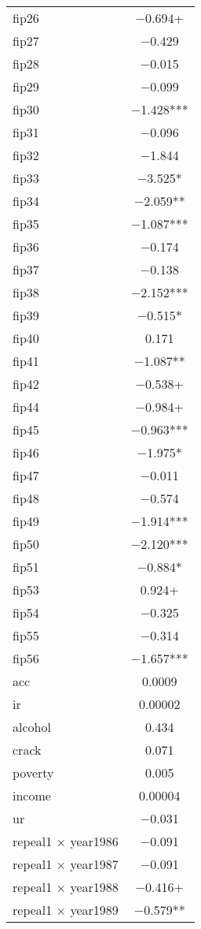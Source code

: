 \documentclass[
]{article}
\begin{document}
\begin{table}
\begin{tabular}[t]{lc}
fip26 & \num{-0.694}+\\
fip27 & \num{-0.429}\\
fip28 & \num{-0.015}\\
fip29 & \num{-0.099}\\
fip30 & \num{-1.428}***\\
fip31 & \num{-0.096}\\
fip32 & \num{-1.844}\\
fip33 & \num{-3.525}*\\
fip34 & \num{-2.059}**\\
fip35 & \num{-1.087}***\\
fip36 & \num{-0.174}\\
fip37 & \num{-0.138}\\
fip38 & \num{-2.152}***\\
fip39 & \num{-0.515}*\\
fip40 & \num{0.171}\\
fip41 & \num{-1.087}**\\
fip42 & \num{-0.538}+\\
fip44 & \num{-0.984}+\\
fip45 & \num{-0.963}***\\
fip46 & \num{-1.975}*\\
fip47 & \num{-0.011}\\
fip48 & \num{-0.574}\\
fip49 & \num{-1.914}***\\
fip50 & \num{-2.120}***\\
fip51 & \num{-0.884}*\\
fip53 & \num{0.924}+\\
fip54 & \num{-0.325}\\
fip55 & \num{-0.314}\\
fip56 & \num{-1.657}***\\
acc & \num{0.0009}\\
ir & \num{0.00002}\\
alcohol & \num{0.434}\\
crack & \num{0.071}\\
poverty & \num{0.005}\\
income & \num{0.00004}\\
ur & \num{-0.031}\\
repeal1 × year1986 & \num{-0.091}\\
repeal1 × year1987 & \num{-0.091}\\
repeal1 × year1988 & \num{-0.416}+\\
repeal1 × year1989 & \num{-0.579}**\\

\end{tabular}
\end{table}
\end{document}
